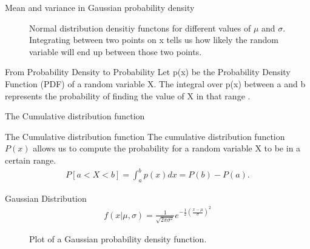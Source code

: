 \documentclass{beamer}
\begin{document}
    \begin{frame}{Mean and variance in Gaussian probability density}
      \begin{figure}
        
        \caption{Normal distribution densitiy functons for different values
                 of $\mu$ and $\sigma$. Integrating between two points on
                 x tells us how likely the random variable will end up between those 
                 two points.}
      \end{figure}
    \end{frame}

    \begin{frame}{From Probability Density to Probability}
      Let p(x) be the
      Probability Density Function
      (PDF) of a random variable
      X. The integral over p(x)
      between a and b represents
      the probability of finding the
      value of X in that range \cite{haslwanter2016introduction}.
    \end{frame}



    \begin{frame}{The Cumulative distribution function}
      \begin{figure}
        
      \end{figure}
    \end{frame}

    \begin{frame}{The Cumulative distribution function}
      The cumulative distribution function $P(x)$ allows us to compute
      the probability for a random variable X to be in a certain range.
      \begin{align}
        P[a < X < b] = \int_a^b p(x) dx = P(b) - P(a).
      \end{align}
      

    \end{frame}

    \begin{frame}{Gaussian Distribution}
      \begin{align}
        f(x|\mu, \sigma) = \frac{1}{\sqrt{2 \pi \sigma^2}}e^{-\frac{1}{2}(\frac{x - \mu}{\sigma})^2}
      \end{align}
      \begin{figure}
      
      \caption{Plot of a Gaussian probability density function.}
      \end{figure}
    \end{frame}
\end{document}
